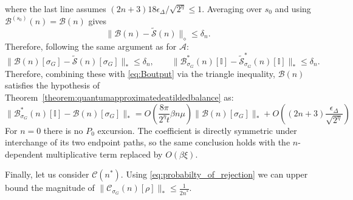 \documentclass[aps,floatfix,10pt,amssymb,amsfont,amsmath,superscriptaddress,float,nofootinbib,longbibliography,nobalancelastpage,twocolumn]{revtex4-2}
\begin{document}
\begin{widetext}
where the last line assumes
$(2n+3)18\epsilon_\Delta/\sqrt{2^\eta}\leq1$.  Averaging over $s_0$ and
using $\mathcal B^{(s_0)}(n)=\mathcal B(n)$ gives
\begin{equation}
    \|\mathcal B(n)-\tilde{\mathcal S}(n)\|_\diamond\leq\delta_n.
\end{equation}
Therefore, following the same argument as for $\mathcal{A}$:
\begin{equation}
    \|\mathcal{B}(n)[\sigma_G] - \tilde{\mathcal{S}}(n)[\sigma_G]\|_* \leq \delta_n,
    \qquad \|\mathcal{B}^*_{\sigma_G}(n)[\mathbb{I}] - \tilde{\mathcal{S}}^*_{\sigma_G}(n)[\mathbb{I}]\|_* \leq \delta_n.
\end{equation}
Therefore, combining these with \eqref{eq:Boutput} via the triangle inequality, $\mathcal{B}(n)$ satisfies the hypothesis of Theorem~\ref{theorem:quantumapproximatedeatildedbalance} as:
\begin{equation}
    \|\mathcal{B}^*_{\sigma_G}(n)[\mathbb{I}] - \mathcal{B}(n)[\sigma_G]\|_* = O\left(\frac{8\pi}{2^{\eta}t}\beta n\mu\right)\|\mathcal{B}(n)[\sigma_G]\|_* +O\left((2n+3)\frac{\epsilon_{\Delta}}{\sqrt{2^{\eta}}}\right) 
\end{equation}
For $n=0$ there is no $P_0$ excursion.  The coefficient is directly
symmetric under interchange of its two endpoint paths, so the same conclusion
holds with the $n$-dependent multiplicative term replaced by $O(\beta\xi)$.

Finally, let us consider $\mathcal{C}(n^*)$. Using \eqref{eq:probabilty_of_rejection} we can upper bound the magnitude of $\|\mathcal{C}_{\sigma_G}(n)[\rho]\|_{*}\leq\frac{1}{2n^*}$.



\end{widetext}
\end{document}
